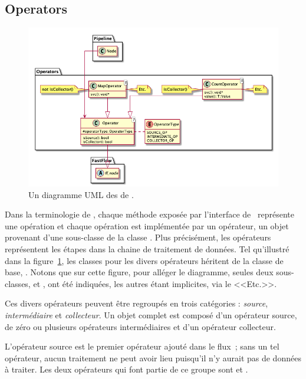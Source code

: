 \subsection{Operators}

\begin{figure}
\centering
         \includegraphics[width=1.0\textwidth]{Figures/operators-details.png}
      \caption{Un diagramme UML des  de \ppff.}
       \label{operators.fig}
\end{figure}


Dans la terminologie de , chaque m\'ethode expos\'ee par l'interface de \ppff\ repr\'esente une op\'eration et chaque op\'eration est impl\'ement\'ee par un op\'erateur, un objet provenant d'une sous-classe de la classe . Plus pr\'ecisément, les op\'erateurs repr\'esentent les \'etapes dans la chaine de traitement de donn\'ees. Tel qu'illustré dans la figure~\ref{operators.fig}, les classes pour les divers op\'erateurs h\'eritent de la classe de base, . 
%
Notons que sur cette figure, pour alléger le diagramme, seules deux sous-classes,  et , ont été indiqu\'ees, les autres \'etant implicites, via le <<Etc.>>.
%

Ces divers opérateurs peuvent \^etre regroupés en trois cat\'egories : \emph{source}, \emph{interm\'ediaire} et \emph{collecteur}.
%
Un objet  complet est compos\'e d'un op\'erateur source, de z\'ero ou plusieurs op\'erateurs interm\'ediaires et d'un op\'erateur collecteur. 

L'op\'erateur source est le premier op\'erateur ajout\'e dans le flux~; sans un tel op\'erateur, aucun traitement ne peut avoir lieu puisqu'il n'y aurait pas de données à traiter. Les deux op\'erateurs qui font partie de ce groupe sont  et .

